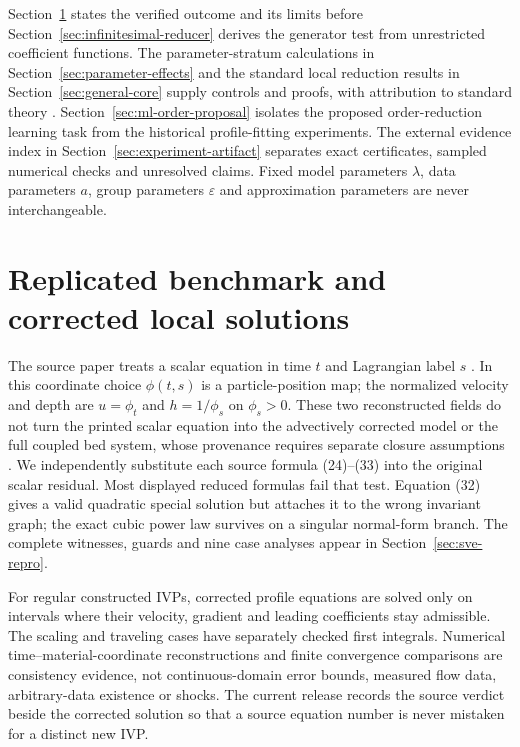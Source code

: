 \documentclass[11pt]{article}
\theoremstyle{definition}
\begin{document}
Section~\ref{sec:replication-first} states the verified outcome and its
limits before Section~\ref{sec:infinitesimal-reducer} derives the generator
test from unrestricted coefficient functions. The parameter-stratum
calculations in Section~\ref{sec:parameter-effects} and the standard local
reduction results in Section~\ref{sec:general-core} supply controls and
proofs, with attribution to standard theory \cite{olver,oliveri2026,anderson2000}.
Section~\ref{sec:ml-order-proposal} isolates the proposed order-reduction
learning task from the historical profile-fitting experiments. The external
evidence index in Section~\ref{sec:experiment-artifact} separates exact
certificates, sampled numerical checks and unresolved claims. Fixed model
parameters $\lambda$, data parameters $a$, group parameters $\varepsilon$
and approximation parameters are never interchangeable.

\section{Replicated benchmark and corrected local solutions}
\label{sec:replication-first}
The source paper treats a scalar equation in time $t$ and Lagrangian label
$s$ \cite{ap}. In this coordinate choice $\phi(t,s)$ is a particle-position
map; the normalized velocity and depth are $u=\phi_t$ and
$h=1/\phi_s$ on $\phi_s>0$. These two reconstructed fields do not turn the
printed scalar equation into the advectively corrected model or the full
coupled bed system, whose provenance requires separate closure assumptions
\cite{fernandez2017}. We independently substitute each source formula
(24)--(33) into the original scalar residual. Most displayed reduced
formulas fail that test. Equation (32) gives a valid quadratic special
solution but attaches it to the wrong invariant graph; the exact cubic
power law survives on a singular normal-form branch. The complete witnesses,
guards and nine case analyses appear in Section~\ref{sec:sve-repro}.

For regular constructed IVPs, corrected profile equations are solved only
on intervals where their velocity, gradient and leading coefficients stay
admissible. The scaling and traveling cases have separately checked first
integrals. Numerical time--material-coordinate reconstructions and finite
convergence comparisons are consistency evidence, not continuous-domain
error bounds, measured flow data, arbitrary-data existence or shocks. The
current release records the source verdict beside the corrected solution so
that a source equation number is never mistaken for a distinct new IVP.
\end{document}
